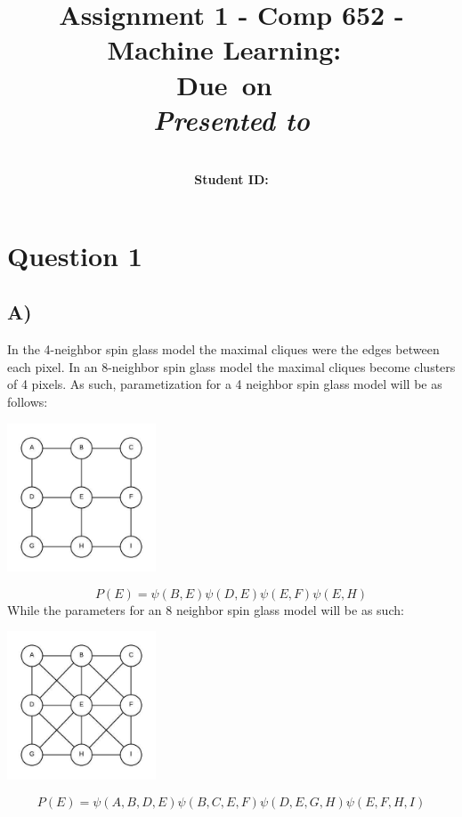\documentclass{report}
\title{Assignment 1 - Comp 652 - Machine Learning}
\title{\vspace{2in}\textmd{\textbf{\hmwkClass:\ \hmwkTitle}}\\
\normalsize\vspace{0.1in}\small{Due\ on\ \hmwkDueDate}\\
\vspace{0.1in}\large{\textit{Presented to \hmwkClassInstructor}}\vspace{3in}}
\date{}
\author{\textbf{\hmwkAuthorName}\\
    \textbf{Student ID: \hmwkAuthorNumber}}
\begin{document}
\maketitle
\section*{Question 1}
\subsection*{A)}
In the 4-neighbor spin glass model the maximal cliques were the edges between
each pixel. In an 8-neighbor spin glass model the maximal cliques become
clusters of 4 pixels. As such, parametization for a 4 neighbor spin glass model
will be as follows:

\begin{center}
\includegraphics[width=125pt, keepaspectratio=true]{ising_model_4n.jpg}\\
\end{center}
\begin{equation}
  P(E) = \psi (B,E) \psi (D,E) \psi (E,F) \psi (E,H)
\end{equation}
While the parameters for an 8 neighbor spin glass model will be as such:
\begin{center}
\includegraphics[width=125pt, keepaspectratio=true]{ising_model_8n.jpg}\\
\end{center}
\begin{equation}
  P(E) = \psi (A,B,D,E) \psi (B,C,E,F) \psi (D,E,G,H) \psi (E,F,H,I)
\end{equation}
\end{document}
